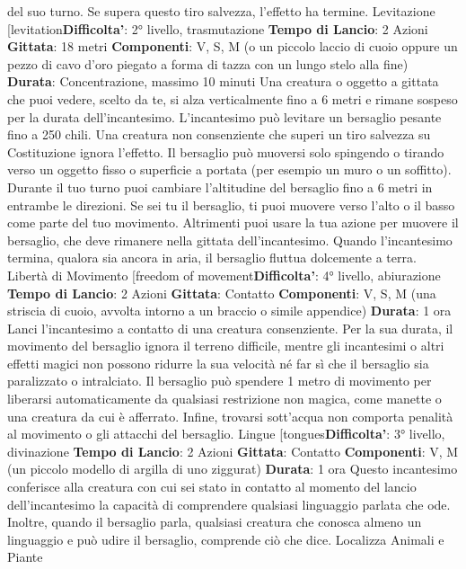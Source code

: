 \begin{multicols}{2}
del suo turno. Se supera questo tiro salvezza, l’effetto
ha termine.
Levitazione
[levitation\textbf{Difficolta'}:
2° livello, trasmutazione
\textbf{Tempo di Lancio}: 2 Azioni
\textbf{Gittata}: 18 metri
\textbf{Componenti}: V, S, M (o un piccolo laccio di cuoio
oppure un pezzo di cavo d’oro piegato a forma di tazza
con un lungo stelo alla fine)
\textbf{Durata}: Concentrazione, massimo 10 minuti
Una creatura o oggetto a gittata che puoi vedere, scelto
da te, si alza verticalmente fino a 6 metri e rimane
sospeso per la durata dell’incantesimo. L’incantesimo
può levitare un bersaglio pesante fino a 250 chili. Una
creatura non consenziente che superi un tiro salvezza
su Costituzione ignora l’effetto.
Il bersaglio può muoversi solo spingendo o tirando
verso un oggetto fisso o superficie a portata (per
esempio un muro o un soffitto). Durante il tuo turno puoi
cambiare l’altitudine del bersaglio fino a 6 metri in
entrambe le direzioni. Se sei tu il bersaglio, ti puoi
muovere verso l’alto o il basso come parte del tuo
movimento. Altrimenti puoi usare la tua azione per
muovere il bersaglio, che deve rimanere nella gittata
dell’incantesimo.
Quando l’incantesimo termina, qualora sia ancora in
aria, il bersaglio fluttua dolcemente a terra.
Libertà di Movimento
[freedom of movement\textbf{Difficolta'}:
4° livello, abiurazione
\textbf{Tempo di Lancio}: 2 Azioni
\textbf{Gittata}: Contatto
\textbf{Componenti}: V, S, M (una striscia di cuoio, avvolta
intorno a un braccio o simile appendice)
\textbf{Durata}: 1 ora
Lanci l’incantesimo a contatto di una creatura
consenziente. Per la sua durata, il movimento del
bersaglio ignora il terreno difficile, mentre gli
incantesimi o altri effetti magici non possono ridurre la
sua velocità né far sì che il bersaglio sia paralizzato o
intralciato.
Il bersaglio può spendere 1 metro di movimento per
liberarsi automaticamente da qualsiasi restrizione non
magica, come manette o una creatura da cui è
afferrato. Infine, trovarsi sott’acqua non comporta
penalità al movimento o gli attacchi del bersaglio.
Lingue
[tongues\textbf{Difficolta'}:
3° livello, divinazione
\textbf{Tempo di Lancio}: 2 Azioni
\textbf{Gittata}: Contatto
\textbf{Componenti}: V, M (un piccolo modello di argilla di uno
ziggurat)
\textbf{Durata}: 1 ora
Questo incantesimo conferisce alla creatura con cui sei
stato in contatto al momento del lancio dell’incantesimo
la capacità di comprendere qualsiasi linguaggio parlata
che ode. Inoltre, quando il bersaglio parla, qualsiasi
creatura che conosca almeno un linguaggio e può udire
il bersaglio, comprende ciò che dice.
Localizza Animali e Piante

\end{multicols}
